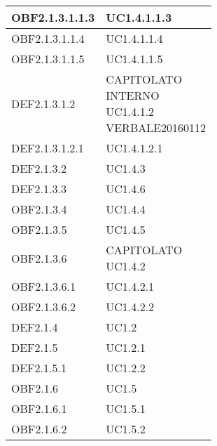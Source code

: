 \documentclass{scalatekids-article}
\begin{document}
\begin{longtable}[H]{|p{5.5cm}|p{5.5cm}|}
  \hline
  OBF2.1.3.1.1.3 & \multiLineCell[t]{UC1.4.1.1.3\\}\\
  \hline
  OBF2.1.3.1.1.4 & \multiLineCell[t]{UC1.4.1.1.4\\}\\
  \hline
  OBF2.1.3.1.1.5 & \multiLineCell[t]{UC1.4.1.1.5\\}\\
  \hline
  \hline
  DEF2.1.3.1.2 & \multiLineCell[t]{CAPITOLATO\\INTERNO\\UC1.4.1.2\\VERBALE20160112\\}\\
  \hline
  DEF2.1.3.1.2.1 & \multiLineCell[t]{UC1.4.1.2.1\\}\\
  \hline
  DEF2.1.3.2 & \multiLineCell[t]{UC1.4.3\\}\\
  \hline
  DEF2.1.3.3 & \multiLineCell[t]{UC1.4.6\\}\\
  \hline
  OBF2.1.3.4 & \multiLineCell[t]{UC1.4.4\\}\\
  \hline
  OBF2.1.3.5 & \multiLineCell[t]{UC1.4.5\\}\\
  \hline
  OBF2.1.3.6 & \multiLineCell[t]{CAPITOLATO\\UC1.4.2\\}\\
  \hline
  OBF2.1.3.6.1 & \multiLineCell[t]{UC1.4.2.1\\}\\
  \hline
  OBF2.1.3.6.2 & \multiLineCell[t]{UC1.4.2.2\\}\\
  \hline
  DEF2.1.4 & \multiLineCell[t]{UC1.2\\}\\
  \hline
  DEF2.1.5 & \multiLineCell[t]{UC1.2.1\\}\\
  \hline
  DEF2.1.5.1 & \multiLineCell[t]{UC1.2.2\\}\\
  \hline
  OBF2.1.6 & \multiLineCell[t]{UC1.5\\}\\
  \hline
  OBF2.1.6.1 & \multiLineCell[t]{UC1.5.1\\}\\
  \hline
  OBF2.1.6.2 & \multiLineCell[t]{UC1.5.2\\}\\

\end{longtable}
\end{document}
